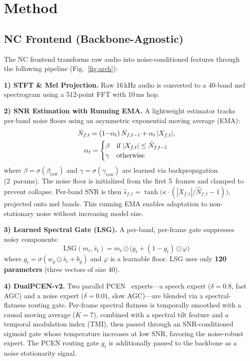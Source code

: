\documentclass[conference]{IEEEtran}
\begin{document}
\section{Method}
\label{sec:method}

\subsection{NC Frontend (Backbone-Agnostic)}
\label{sec:nc_frontend}

The NC frontend transforms raw audio into noise-conditioned features through the following pipeline (Fig.~\ref{fig:arch}):

\textbf{1) STFT \& Mel Projection.}
Raw 16\,kHz audio is converted to a 40-band mel spectrogram using a 512-point FFT with 10\,ms hop.

\textbf{2) SNR Estimation with Running EMA.}
A lightweight estimator tracks per-band noise floors using an asymmetric exponential moving average (EMA):
\begin{gather}
    \hat{N}_{f,t} = (1{-}\alpha_t)\,\hat{N}_{f,t-1} + \alpha_t\,|X_{f,t}|, \notag\\
    \alpha_t = \begin{cases} \beta & \text{if } |X_{f,t}| \leq \hat{N}_{f,t-1} \\ \gamma & \text{otherwise} \end{cases}
\end{gather}
where $\beta = \sigma(\beta_{\text{raw}})$ and $\gamma = \sigma(\gamma_{\text{raw}})$ are learned via backpropagation (2~params).
The noise floor is initialized from the first 5~frames and clamped to prevent collapse.
Per-band SNR is then $\hat{s}_{f,t} = \tanh\big(\kappa \cdot (|X_{f,t}| / \hat{N}_{f,t} - 1)\big)$, projected onto mel bands.
This running EMA enables adaptation to non-stationary noise without increasing model size.

\textbf{3) Learned Spectral Gate (LSG).}
A per-band, per-frame gate suppresses noisy components:
\begin{equation}
    \text{LSG}(m_t, \hat{s}_t) = m_t \odot \big(g_t + (1-g_t) \odot \varphi\big)
\end{equation}
where $g_t = \sigma(w_g \odot \hat{s}_t + b_g)$ and $\varphi$ is a learnable floor.
LSG uses only \textbf{120 parameters} (three vectors of size 40).

\textbf{4) DualPCEN-v2.}
Two parallel PCEN~\cite{wang2017trainable} experts---a speech expert ($\delta{=}0.8$, fast AGC) and a noise expert ($\delta{=}0.01$, slow AGC)---are blended via a spectral-flatness routing gate.
Per-frame spectral flatness is temporally smoothed with a causal moving average ($K{=}7$), combined with a spectral tilt feature and a temporal modulation index (TMI), then passed through an SNR-conditioned sigmoid gate whose temperature increases at low SNR, favoring the noise-robust expert.
The PCEN routing gate $g_t$ is additionally passed to the backbone as a noise stationarity signal.
\end{document}
